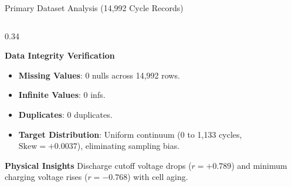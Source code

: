 \documentclass[aspectratio=169, 10pt]{beamer}
\begin{document}
\begin{frame}{Primary Dataset Analysis (14,992 Cycle Records)}
\begin{columns}[T]
  \begin{column}{0.34\textwidth}
    \begin{block}{\textbf{Data Integrity Verification}}
      \scriptsize
      \begin{itemize}
        \item \textbf{Missing Values}: 0 nulls across 14,992 rows.
        \item \textbf{Infinite Values}: 0 infs.
        \item \textbf{Duplicates}: 0 duplicates.
        \item \textbf{Target Distribution}: Uniform continuum (0 to 1,133 cycles, $\text{Skew} = +0.0037$), eliminating sampling bias.
      \end{itemize}
    \end{block}
    \vspace{0.2em}
    \begin{exampleblock}{\textbf{Physical Insights}}
      \scriptsize Discharge cutoff voltage drops ($r=+0.789$) and minimum charging voltage rises ($r=-0.768$) with cell aging.
    \end{exampleblock}
  \end{column}
\end{columns}
\end{frame}
\end{document}
